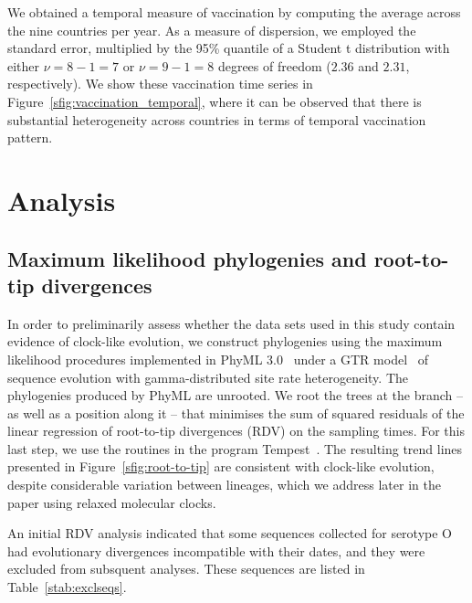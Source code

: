 \documentclass[a4paper,10pt]{article}
\begin{document}
We obtained a temporal measure of vaccination by computing the average across the nine countries per year.
As a measure of dispersion, we employed the standard error, multiplied by the 95\% quantile of a Student t distribution with either $\nu = 8 -1 = 7$ or $\nu = 9-1 = 8$ degrees of freedom ($2.36$ and $2.31$, respectively).
We show these vaccination time series in Figure~\ref{sfig:vaccination_temporal}, where it can be observed that there is substantial heterogeneity across countries in terms of temporal vaccination pattern.

\section*{Analysis}

\subsection*{Maximum likelihood phylogenies and root-to-tip divergences}

In order to preliminarily assess whether the data sets used in this study contain evidence of clock-like evolution, we construct phylogenies using the maximum likelihood procedures implemented in PhyML 3.0~\cite{M-Guindon2003} under a GTR model~\cite{M-Tavare1986} of sequence evolution with gamma-distributed site rate heterogeneity.
The phylogenies produced by PhyML are unrooted.
We root the trees at the branch -- as well as a position along it -- that minimises the sum of squared residuals of the linear regression of root-to-tip divergences (RDV) on the sampling times.
For this last step, we use the routines in the program Tempest~\citep{M-Rambaut2016}.
The resulting trend lines presented in Figure~\ref{sfig:root-to-tip} are consistent with clock-like evolution, despite considerable variation between lineages, which we address later in the paper using relaxed molecular clocks.

An initial RDV analysis indicated that some sequences collected for serotype O had evolutionary divergences incompatible with their dates, and they were excluded from subsquent analyses.
These sequences are listed in Table~\ref{stab:exclseqs}.
\end{document}
